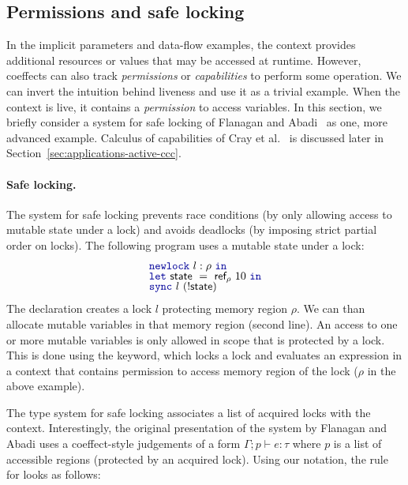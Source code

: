 \subsection{Permissions and safe locking}
In the implicit parameters and data-flow examples, the context provides additional resources or
values that may be accessed at runtime. However, coeffects can also track \emph{permissions} or
\emph{capabilities} to perform some operation. We can invert the intuition behind liveness and
use it as a trivial example. When the context is live, it contains a \emph{permission} to access
variables. In this section, we briefly consider a system for safe locking of Flanagan and
Abadi~\cite{app-safe-locking} as one, more advanced example. Calculus of capabilities of
Cray et al.~\cite{app-capabilities} is discussed later in Section~\ref{sec:applications-active-ccc}.

\paragraph{Safe locking.}
The system for safe locking prevents race conditions (by only allowing access to mutable state
under a lock) and avoids deadlocks (by imposing strict partial order on locks). The following
program uses a mutable state under a lock:
%
\begin{equation*}
\begin{array}{l}
\kvd{newlock}~l:\rho~\kvd{in}\\[-0.25em]
\kvd{let}~\ident{state}~=~\ident{ref}_\rho~10~\kvd{in}\\[-0.25em]
\kvd{sync}~l~(!\ident{state})
\end{array}
\end{equation*}
%
The declaration  creates a lock $l$ protecting memory region $\rho$. We can than
allocate mutable variables in that memory region (second line). An access to one or more mutable
variables is only allowed in scope that is protected by a lock. This is done using the  keyword,
which locks a lock and evaluates an expression in a context that contains permission to access
memory region of the lock ($\rho$ in the above example).

The type system for safe locking associates a list of acquired locks with the context.
Interestingly, the original presentation of the system by Flanagan and Abadi \cite{app-safe-locking}
uses a coeffect-style judgements of a form $\Gamma; p \vdash e : \tau$ where $p$ is a list of
accessible regions (protected by an acquired lock). Using our notation, the rule for 
looks as follows:

